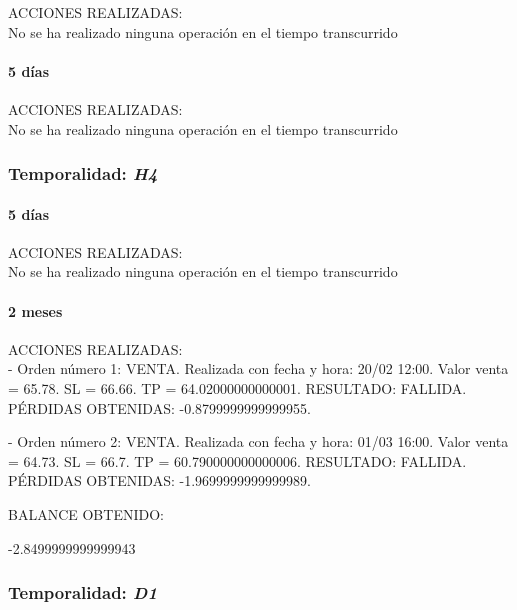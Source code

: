 ACCIONES REALIZADAS:\\

No se ha realizado ninguna operación en el tiempo transcurrido

\paragraph{5 días}

ACCIONES REALIZADAS:\\

No se ha realizado ninguna operación en el tiempo transcurrido

\subsubsection{Temporalidad: \textit{H4}}

\paragraph{5 días}

ACCIONES REALIZADAS:\\

No se ha realizado ninguna operación en el tiempo transcurrido

\paragraph{2 meses}

ACCIONES REALIZADAS:\\

- Orden número 1: VENTA. Realizada con fecha y hora: 20/02 12:00. Valor venta = 65.78. SL = 66.66. TP = 64.02000000000001. RESULTADO: FALLIDA. PÉRDIDAS OBTENIDAS: -0.8799999999999955.\newline

- Orden número 2: VENTA. Realizada con fecha y hora: 01/03 16:00. Valor venta = 64.73. SL = 66.7. TP = 60.790000000000006. RESULTADO: FALLIDA. PÉRDIDAS OBTENIDAS: -1.9699999999999989.\newline


\color{blue}
BALANCE OBTENIDO:\newline

-2.8499999999999943\newline
\color{black}

\subsubsection{Temporalidad: \textit{D1}}

